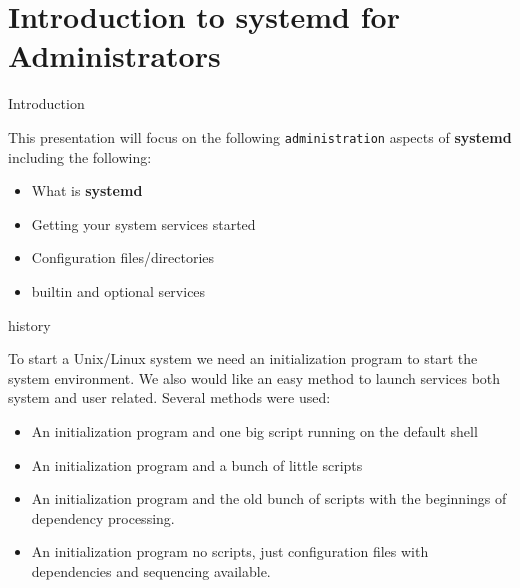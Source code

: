 \section{Introduction to systemd for Administrators}

\begin{frame}
   {Introduction}

	This presentation will focus on the following \texttt{administration}
	aspects of \textbf{systemd} including the following: 
   \begin{itemize}
	\item What is \textbf{systemd}
	\item Getting your system services started
	\item Configuration files/directories 
	\item builtin and optional services 
    \end{itemize}

\end{frame}

\cprotect\note{


}

\begin{frame} {history}

        To start a Unix/Linux system we need an initialization program
        to start the system environment. We also would like an easy
        method to launch services both system and user
        related. Several methods were used:

        \begin{itemize}
        \item An initialization program and one
                big script running on the default shell
        \item An initialization program and a bunch of little scripts
        \item An initialization program and the old bunch of scripts
                        with the beginnings of
                        dependency processing.
        \item An initialization program no scripts, just configuration files
                with dependencies and sequencing available.
        \end{itemize}


\end{frame}

\cprotect\note{


}



